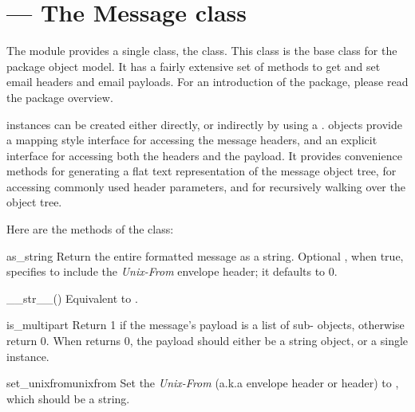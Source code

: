 \section{ ---
         The Message class}



The  module provides a single class, the
 class.  This class is the base class for the
 package object model.  It has a fairly extensive set of
methods to get and set email headers and email payloads.  For an
introduction of the  package, please read the
 package overview.

 instances can be created either directly, or
indirectly by using a .  
objects provide a mapping style interface for accessing the message
headers, and an explicit interface for accessing both the headers and
the payload.  It provides convenience methods for generating a flat
text representation of the message object tree, for accessing commonly
used header parameters, and for recursively walking over the object
tree.

Here are the methods of the  class:

\begin{methoddesc}[Message]{as_string}{}
Return the entire formatted message as a string.  Optional
, when true, specifies to include the \emph{Unix-From}
envelope header; it defaults to 0.
\end{methoddesc}

\begin{methoddesc}[Message]{__str__()}{}
Equivalent to .
\end{methoddesc}

\begin{methoddesc}[Message]{is_multipart}{}
Return 1 if the message's payload is a list of sub-
objects, otherwise return 0.  When  returns 0,
the payload should either be a string object, or a single
 instance.
\end{methoddesc}

\begin{methoddesc}[Message]{set_unixfrom}{unixfrom}
Set the \emph{Unix-From} (a.k.a envelope header or 
header) to , which should be a string.
\end{methoddesc}

